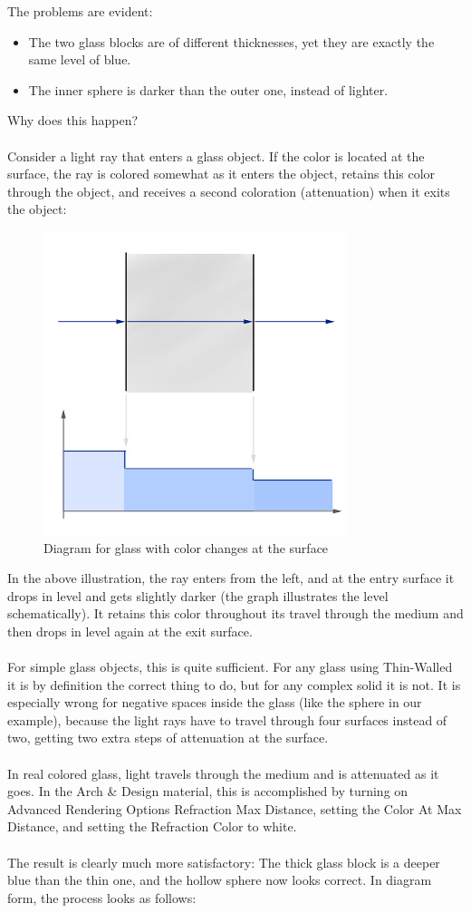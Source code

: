 \documentclass[10pt,a4paper]{article}
\begin{document}
The problems are evident:

\begin{itemize}
	\item The two glass blocks are of different thicknesses, yet they are exactly the same level of blue.
	\item The inner sphere is darker than the outer one, instead of lighter.
\end{itemize}

Why does this happen?
\\
\\
Consider a light ray that enters a glass object. If the color is located at the surface, the ray is colored somewhat as it enters the object, retains this color through the object, and receives a second coloration (attenuation) when it exits the object:

\begin{figure}[tbh]
	\centering
	\includegraphics[width=0.5\linewidth]{"figure/Diagram for glass with color changes at the surface"}
	\caption{Diagram for glass with color changes at the surface}
	\label{fig:diagram-for-glass-with-color-changes-at-the-surface}
\end{figure}

In the above illustration, the ray enters from the left, and at the entry surface it drops in level and gets slightly darker (the graph illustrates the level schematically). 
It retains this color throughout its travel through the medium and then drops in level again at the exit surface.
\\
\\
For simple glass objects, this is quite sufficient. For any glass using Thin-Walled it is by definition the correct thing to do, but for any complex solid it is not. 
It is especially wrong for negative spaces inside the glass (like the sphere in our example), because the light rays have to travel through four surfaces instead of two, getting two extra steps of attenuation at the surface.
\\
\\
In real colored glass, light travels through the medium and is attenuated as it goes. 
In the Arch \& Design material, this is accomplished by turning on Advanced Rendering Options Refraction  Max Distance, setting the Color At Max Distance, and setting the Refraction Color to white.
\\
\\
The result is clearly much more satisfactory: The thick glass block is a deeper blue than the thin one, and the hollow sphere now looks correct. In diagram form, the process looks as follows:
\end{document}

